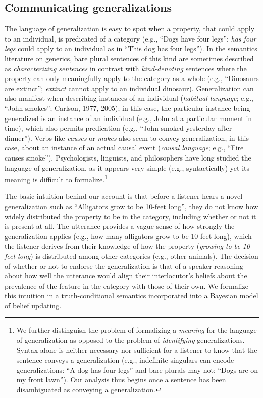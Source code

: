 \documentclass[english,,man,floatsintext]{apa6}
\let\rmarkdownfootnote\footnote%
\def\footnote{\protect\rmarkdownfootnote}
\theoremstyle{definition}
\theoremstyle{definition}
\theoremstyle{definition}
\theoremstyle{remark}
\begin{document}
\hypertarget{communicating-generalizations}{%
\subsection{Communicating
generalizations}\label{communicating-generalizations}}

The language of generalization is easy to spot when a property, that
could apply to an individual, is predicated of a category (e.g.,
\enquote{Dogs have four legs}: \emph{has four legs} could apply to an
individual as in \enquote{This dog has four legs}). In the semantics
literature on generics, bare plural sentences of this kind are sometimes
described as \emph{characterizing sentences} in contrast with
\emph{kind-denoting} sentences where the property can only meaningfully
apply to the category as a whole (e.g., \enquote{Dinosaurs are extinct};
\emph{extinct} cannot apply to an individual dinosaur). Generalization
can also manifest when describing instances of an individual
(\emph{habitual language}; e.g., ``John smokes''; Carlson, 1977, 2005);
in this case, the particular instance being generalized is an instance
of an individual (e.g., John at a particular moment in time), which also
permits predication (e.g., \enquote{John smoked yesterday after
dinner}). Verbs like \emph{causes} or \emph{makes} also seem to convey
generalization, in this case, about an instance of an actual causal
event (\emph{causal language}; e.g., \enquote{Fire causes smoke}).
Psychologists, linguists, and philosophers have long studied the
language of generalization, as it appears very simple (e.g.,
syntactically) yet its meaning is difficult to formalize.\footnote{We
  further distinguish the problem of formalizing a \emph{meaning} for
  the language of generalization as opposed to the problem of
  \emph{identifying} generalizations. Syntax alone is neither necessary
  nor sufficient for a listener to know that the sentence conveys a
  generalization (e.g., indefinite singulars can encode generalizations:
  \enquote{A dog has four legs} and bare plurals may not: \enquote{Dogs
  are on my front lawn}). Our analysis thus begins once a sentence has
  been disambiguated as conveying a generalization. }

The basic intuition behind our account is that before a listener hears a
novel generalization such as \enquote{Alligators grow to be 10-feet
long}, they do not know how widely distributed the property to be in the
category, including whether or not it is present at all. The utterance
provides a vague sense of how strongly the generalization applies (e.g.,
how many alligators grow to be 10-feet long), which the listener derives
from their knowledge of how the property (\emph{growing to be 10-feet
long}) is distributed among other categories (e.g., other animals). The
decision of whether or not to endorse the generalization is that of a
speaker reasoning about how well the utterance would align their
interlocutor's beliefs about the prevalence of the feature in the
category with those of their own. We formalize this intuition in a
truth-conditional semantics incorporated into a Bayesian model of belief
updating.
\end{document}
